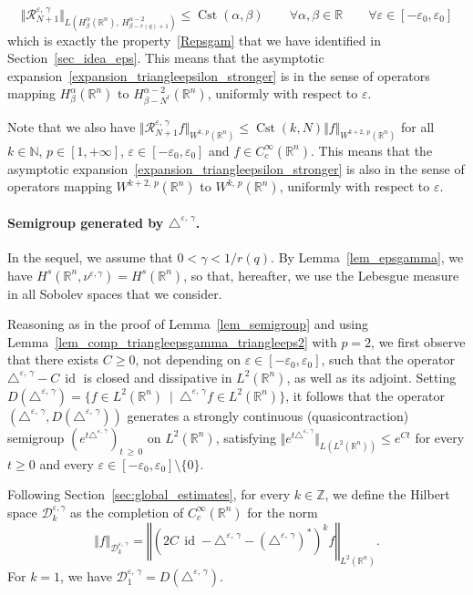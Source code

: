 \documentclass[AHL,Unicode,published]{cedram}
\newcommand*\R{\mathbb{R}}
\newcommand*\N{\mathbb{N}}
\newcommand*\Z{\mathbb{Z}}
\newcommand{\calR}{\mathcal{R}}
\newcommand{\calD}{\mathcal{D}}
\DeclareMathOperator{\Cst}{Cst}
\DeclareMathOperator{\id}{id}
\renewcommand{\geq}{\geqslant}
\renewcommand{\leq}{\leqslant}
\let\oldforall\forall
\renewcommand*{\forall}{\mathrel{\oldforall}}
\begin{document}
\[
\Vert \calR_{N+1}^{\varepsilon,\,\gamma}\Vert_{L\left(H^\alpha_\beta(\R^n),\,H^{\alpha-2}_{\beta-r(q)+1}\right)} \leq \Cst(\alpha,\beta) \qquad \forall\alpha,\beta\in\R \qquad \forall\varepsilon\in[-\varepsilon_0,\varepsilon_0]
\]
which is exactly the property~\eqref{Repsgam} that we have identified in Section~\ref{sec_idea_eps}. This means that the asymptotic expansion~\eqref{expansion_triangleepsilon_stronger} is in the sense of operators mapping $H^\alpha_\beta(\R^n)$ to $H^{\alpha-2}_{\beta-N^\ell}(\R^n)$, uniformly with respect to $\varepsilon$.

Note that we also have $\Vert \calR_{N+1}^{\varepsilon,\,\gamma} f \Vert_{W^{k,\,p}(\R^n)} \leq \Cst(k,N) \Vert f\Vert_{W^{k+2,\,p}(\R^n)}$ for all $k\in\N$, $p\in[1,+\infty]$, $\varepsilon\in[-\varepsilon_0,\varepsilon_0]$ and $f\in C_c^\infty(\R^n)$. This means that the asymptotic expansion~\eqref{expansion_triangleepsilon_stronger} is also in the sense of operators mapping $W^{k+2,\,p}(\R^n)$ to $W^{k,\,p}(\R^n)$, uniformly with respect to $\varepsilon$.



\paragraph{Semigroup generated by $\triangle^{\varepsilon,\,\gamma}$.}
In the sequel, we assume that $0<\gamma<1/r(q)$. By Lemma~\ref{lem_epsgamma}, we have $H^s(\R^n,\nu^{\varepsilon,\gamma})=H^s(\R^n)$, so that, hereafter, we use the Lebesgue measure in all Sobolev spaces that we consider.

Reasoning as in the proof of Lemma~\ref{lem_semigroup} and using Lemma~\ref{lem_comp_triangleepsgamma_triangleeps2} with $p=2$, we first observe that there exists $C\geq 0$, not depending on $\varepsilon\in[-\varepsilon_0,\varepsilon_0]$, such that the operator $\triangle^{\varepsilon,\,\gamma}-C\,\id$ is closed and dissipative in $L^2(\R^n)$, as well as its adjoint. Setting $D(\triangle^{\varepsilon,\,\gamma}) = \{ f\in L^2(\R^n) \ \mid\ \triangle^{\varepsilon,\,\gamma} f \in L^2(\R^n) \}$, it follows that the operator $(\triangle^{\varepsilon,\,\gamma},D(\triangle^{\varepsilon,\,\gamma}))$ generates a strongly continuous (quasicontraction) semigroup $(e^{t\triangle^{\varepsilon,\,\gamma}})_{t\,\geq\,0}$ on $L^2(\R^n)$, satisfying $\Vert e^{t\triangle^{\varepsilon,\,\gamma}}\Vert_{L(L^2(\R^n))} \leq e^{Ct}$ for every $t\geq 0$ and every $\varepsilon\in[-\varepsilon_0,\varepsilon_0]\setminus\{0\}$.

Following Section~\ref{sec:global_estimates}, for every $k\in\Z$, we define the Hilbert space $\calD^{\varepsilon,\gamma}_k$ as the completion of $C_c^\infty(\R^n)$ for the norm
\[
\Vert f\Vert_{\calD^{\varepsilon,\,\gamma}_k} = \left\Vert \left(2C\,\id-\triangle^{\varepsilon,\,\gamma}-(\triangle^{\varepsilon,\,\gamma})^*\right)^k f\right\Vert_{L^2(\R^n)}.
\]
For $k=1$, we have $\calD^{\varepsilon,\,\gamma}_1 = D(\triangle^{\varepsilon,\,\gamma})$.
\end{document}
